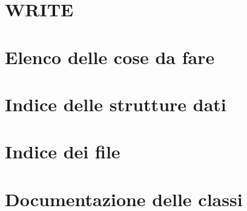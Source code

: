 \documentclass[twoside]{book}
\newcommand{\+}{\discretionary{\mbox{\scriptsize$\hookleftarrow$}}{}{}}
\begin{document}
\chapter{W\+R\+I\+T\+E}
\label{md_WRITE}
\hypertarget{md_WRITE}{}

\chapter{Elenco delle cose da fare}
\label{todo}
\hypertarget{todo}{}

\chapter{Indice delle strutture dati}

\chapter{Indice dei file}

\chapter{Documentazione delle classi}











\end{document}
